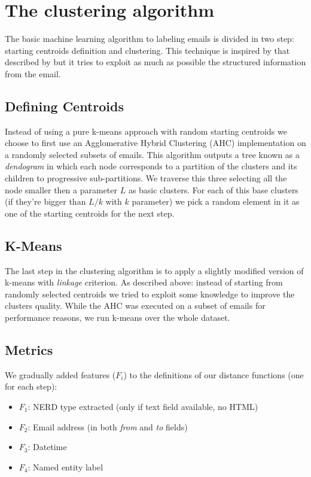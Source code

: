 \documentclass[a4paper,12pt]{report}
\begin{document}
\section{The clustering algorithm}
The basic machine learning algorithm to labeling emails is divided in two step: starting centroids definition and clustering. This technique is inspired by that described by \cite{Manco2008} but it tries to exploit as much as possible the structured information from the email.



\subsection{Defining Centroids}
Instead of using a pure k-means approach with random starting centroids we choose to first use an Agglomerative Hybrid Clustering (AHC) implementation on a randomly selected subsets of emails. This algorithm outputs a tree known as a \emph{dendogram} in which each node corresponds to a partition of the clusters and its children to progressive sub-partitions. We traverse this three selecting all the node smaller then a parameter $L$ as basic clusters.
For each of this base clusters (if they're bigger than $L/k$ with $k$ parameter) we pick a random element in it as one of the starting centroids for the next step.

\subsection{K-Means}
The last step in the clustering algorithm is to apply a slightly modified version of k-means with \emph{linkage} criterion. As described above: instead of starting from randomly selected centroids we tried to exploit some knowledge to improve the clusters quality. While the AHC was executed on a subset of emails for performance reasons, we run k-means over the whole dataset.

\subsection{Metrics}
We gradually added features ($F_{i}$) to the definitions of our distance functions (one for each step):
\begin{itemize}
\item $F_{1}$: NERD type extracted (only if text field available, no HTML)
\item $F_{2}$: Email address (in both \emph{from} and \emph{to} fields)
\item $F_{3}$: Datetime 
\item $F_{4}$: Named entity label
\end{itemize}
\end{document}
